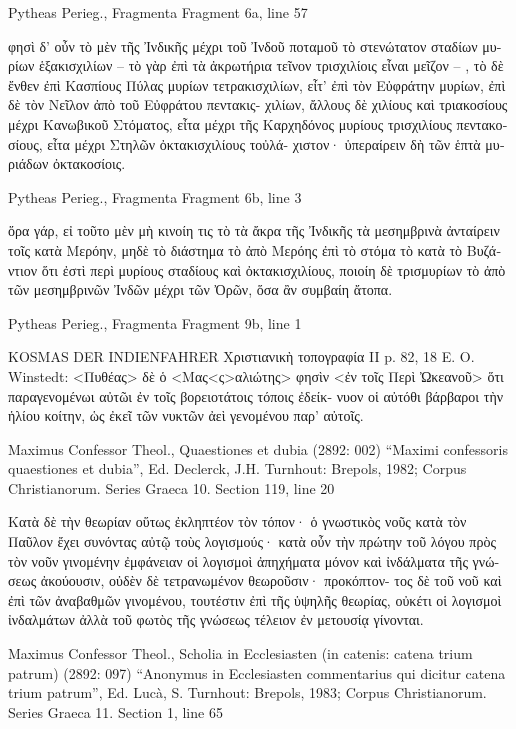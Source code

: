 \documentclass[12pt,letterpaper,twoside,final]{memoir}
\begin{document}
\begin{greek}
Pytheas Perieg., Fragmenta 
Fragment 6a, line 57

                                                φησὶ δ' οὖν τὸ 
μὲν τῆς Ἰνδικῆς μέχρι τοῦ Ἰνδοῦ ποταμοῦ τὸ στενώτατον 
σταδίων μυρίων ἑξακισχιλίων – τὸ γὰρ ἐπὶ τὰ ἀκρωτήρια 
τεῖνον τρισχιλίοις εἶναι μεῖζον – , τὸ δὲ ἔνθεν ἐπὶ Κασπίους 
Πύλας μυρίων τετρακισχιλίων, εἶτ' ἐπὶ τὸν Εὐφράτην 
μυρίων, ἐπὶ δὲ τὸν Νεῖλον ἀπὸ τοῦ Εὐφράτου πεντακις-
χιλίων, ἄλλους δὲ χιλίους καὶ τριακοσίους μέχρι Κανωβικοῦ 
Στόματος, εἶτα μέχρι τῆς Καρχηδόνος μυρίους τρισχιλίους 
πεντακοσίους, εἶτα μέχρι Στηλῶν ὀκτακισχιλίους τοὐλά-
χιστον· ὑπεραίρειν δὴ τῶν ἑπτὰ μυριάδων ὀκτακοσίοις. 



Pytheas Perieg., Fragmenta 
Fragment 6b, line 3

                           ὅρα γάρ, εἰ τοῦτο μὲν μὴ κινοίη 
τις τὸ τὰ ἄκρα τῆς Ἰνδικῆς τὰ μεσημβρινὰ ἀνταίρειν τοῖς 
κατὰ Μερόην, μηδὲ τὸ διάστημα τὸ ἀπὸ Μερόης ἐπὶ τὸ 
στόμα τὸ κατὰ τὸ Βυζάντιον ὅτι ἐστὶ περὶ μυρίους 
σταδίους καὶ ὀκτακισχιλίους, ποιοίη δὲ τρισμυρίων τὸ 
ἀπὸ τῶν μεσημβρινῶν Ἰνδῶν μέχρι τῶν Ὀρῶν, ὅσα 
ἂν συμβαίη ἄτοπα. 



Pytheas Perieg., Fragmenta 
Fragment 9b, line 1

KOSMAS DER INDIENFAHRER Χριστιανικὴ 
τοπογραφία II p. 82, 18 E. O. Winstedt: <Πυθέας> δὲ ὁ 
<Μας<ς>αλιώτης> φησὶν <ἐν τοῖς Περὶ Ὠκεανοῦ> ὅτι   
παραγενομένωι αὐτῶι ἐν τοῖς βορειοτάτοις τόποις ἐδείκ-
νυον οἱ αὐτόθι βάρβαροι τὴν ἡλίου κοίτην, ὡς ἐκεῖ τῶν 
νυκτῶν ἀεὶ γενομένου παρ' αὐτοῖς. 



Maximus Confessor Theol., Quaestiones et dubia (2892: 002)
“Maximi confessoris quaestiones et dubia”, Ed. Declerck, J.H.
Turnhout: Brepols, 1982; Corpus Christianorum. Series Graeca 10.
Section 119, line 20

                                        Κατὰ δὲ τὴν θεωρίαν 
οὕτως ἐκληπτέον τὸν τόπον· ὁ γνωστικὸς νοῦς κατὰ τὸν 
Παῦλον ἔχει συνόντας αὐτῷ τοὺς λογισμούς· κατὰ οὖν τὴν 
πρώτην τοῦ λόγου πρὸς τὸν νοῦν γινομένην ἐμφάνειαν οἱ 
λογισμοὶ ἀπηχήματα μόνον καὶ ἰνδάλματα τῆς γνώσεως 
ἀκούουσιν, οὐδὲν δὲ τετρανωμένον θεωροῦσιν· προκόπτον-
τος δὲ τοῦ νοῦ καὶ ἐπὶ τῶν ἀναβαθμῶν γινομένου, 
τουτέστιν ἐπὶ τῆς ὑψηλῆς θεωρίας, οὐκέτι οἱ λογισμοὶ 
ἰνδαλμάτων ἀλλὰ τοῦ φωτὸς τῆς γνώσεως τέλειον ἐν 
μετουσίᾳ γίνονται. 



Maximus Confessor Theol., Scholia in Ecclesiasten (in catenis: catena trium patrum) (2892: 097)
“Anonymus in Ecclesiasten commentarius qui dicitur catena trium patrum”, Ed. Lucà, S.
Turnhout: Brepols, 1983; Corpus Christianorum. Series Graeca 11.
Section 1, line 65


\end{greek}
\end{document}

